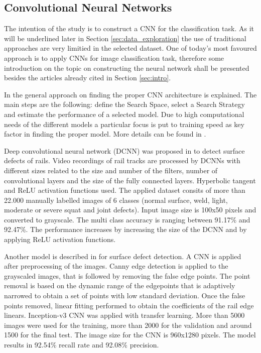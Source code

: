 \documentclass[10pt, final]{article}
\begin{document}
\subsection{Convolutional Neural Networks}
The intention of the study is to construct a CNN for the classification task.
As it will be underlined later in Section \ref{sec:data_exploration} the use of traditional approaches are very
limitied in the selected dataset.
One of today's most favoured approach is to apply CNNs for image classification task, therefore some introduction
on the topic on constructing the neural network shall be presented besides the articles already cited in
Section \ref{sec:intro}.

In \cite{elsken_neural_2019} the general approach on finding the proper CNN architecture is explained.
The main steps are the following: define the Search Space, select a Search Strategy and estimate the performance
of a selected model.
Due to high computational needs of the different models a particular focus is put to training speed as key factor
in finding the proper model.
More details can be found in \cite{hutter_automated_2019}.

Deep convolutional neural network (DCNN) was proposed in \cite{faghih-roohi_deep_2016} to detect surface defects of rails.
Video recordings of rail tracks are processed by DCNNs with different sizes related to the size and number
of the filters, number of convolutional layers and the size of the fully connected layers.
Hyperbolic tangent and ReLU activation functions used.
The applied dataset consits of more than 22.000 manually labelled images of 6 classes
(normal surface, weld, light, moderate or severe squat and joint defects).
Input image size is 100x50 pixels and converted to grayscale.
The multi class accuracy is ranging between 91.17\% and 92.47\%.
The performance increases by increasing the size of the DCNN and by applying ReLU activation functions.

Another model is described in \cite{shang_detection_2018} for surface defect detection.
A CNN is applied after preprocessing of the images.
Canny edge detection is applied to the grayscaled images, that is followed by removing the false edge points.
The point removal is based on the dynamic range of the edgepoints that is adaptively narrowed to obtain
a set of points with low standard deviation.
Once the false points removed, linear fitting performed to obtain the coefficients of the rail edge linears.
Inception-v3 CNN was applied with transfer learning.
More than 5000 images were used for the training, more than 2000 for the validation and around 1500 for the final test.
The image size for the CNN is 960x1280 pixels.
The model results in 92.54\% recall rate and 92.08\% precision.
\end{document}
